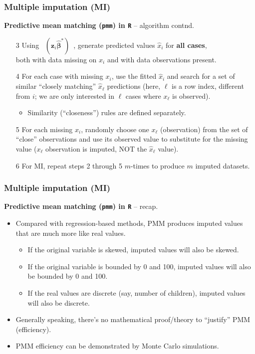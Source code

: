 \documentclass{beamer}
\begin{document}
\begin{frame}
\frametitle{Multiple imputation (MI)}
\textbf{Predictive mean matching (\texttt{pmm}) in \texttt{R}} -- algorithm contnd.\\
\bigskip
\begin{enumerate}
    \item[3] Using ~$(\bm{z}_i \hat{\bm{\beta}}^{\ast})$~, generate predicted values $\hat{x}_i$ for \textbf{all cases}, \\both with data missing on $x_i$ and with data observations present.
    \medskip
    \item[4] For each case with missing $x_i$, use the fitted $\hat{x}_i$ and search for a set of similar ``closely matching'' $\hat{x}_{\ell}$ predictions (here, $\ell$ is a row index, different from $i$; we are only interested in ${\ell}$ cases where $x_{\ell}$ is observed).
    \medskip
    \begin{itemize}
        \item Similarity (``closeness'') rules are defined separately.
    \end{itemize}
    \medskip
    \item[5] For each missing $x_i$, randomly choose one $x_{\ell}$ (observation) from the set of ``close'' observations and use its observed value to substitute for the missing value ($x_{\ell}$ observation is imputed, NOT the $\hat{x}_{\ell}$ value).
    \medskip
    \item[6] For MI, repeat steps 2 through 5 $m$-times to produce $m$ imputed datasets.  
\end{enumerate}
\end{frame}
\begin{frame}
\frametitle{Multiple imputation (MI)}
\textbf{Predictive mean matching (\texttt{pmm}) in \texttt{R}} -- recap.\\
\medskip
\begin{itemize}
    \item Compared with regression-based methods, PMM produces imputed values that are much more like real values. 
    \smallskip
    \begin{itemize}
        \item If the original variable is skewed, imputed values will also be skewed.
        \smallskip
        \item If the original variable is bounded by 0 and 100, imputed values will also be bounded by 0 and 100.
        \smallskip
        \item If the real values are discrete (say, number of children), imputed values will also be discrete. 
    \end{itemize} 
    \smallskip
    \item Generally speaking,  there’s no mathematical proof/theory to ``justify'' PMM (efficiency).
    \smallskip
    \item PMM efficiency can be demonstrated by Monte Carlo simulations.
\end{itemize}
\end{frame}
\end{document}
